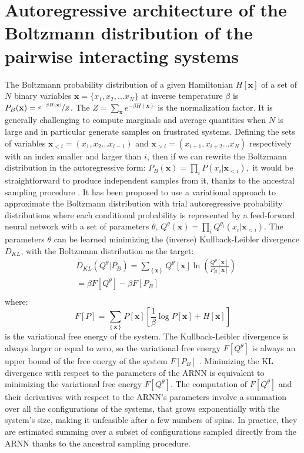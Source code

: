 \documentclass[aps,physrev,10pt,floatfix,reprint]{revtex4-2}
\begin{document}
\section{Autoregressive architecture of the Boltzmann distribution of the pairwise interacting systems}
\label{sec:ARNN_boltzmann}
The Boltzmann probability distribution of a given Hamiltonian $H[\mathbf{x}]$ of a set of $N$ binary variables $\mathbf{x}=\{x_1, x_2,...x_N\}$ at inverse temperature $\beta$ is $P_{B}(\mathbf{x}) = \nicefrac{e^{-\beta H\left(\mathbf{x}\right)}}{Z}$. The $Z=\sum_{\mathbf{x}}e^{-\beta H\left(\mathbf{x}\right)}$ is the normalization factor.
It is generally challenging to compute marginals and average quantities when $N$ is large and in particular generate samples on frustrated systems. Defining the sets of variables $\mathbf{x}_{<i}=\left(x_{1},x_{2}\dots x_{i-1}\right)$ and $\mathbf{x}_{>i}=\left(x_{i+1},x_{i+2}\dots x_{N}\right)$ respectively with an index smaller and larger than $i$, then if we can rewrite the Boltzmann distribution in the autoregressive form:
$
P_{B}\left(\mathbf{x}\right)=\prod_{i}P\left(x_{i}|\mathbf{x}_{<i}\right),
$
it would be straightforward to produce independent samples from it, thanks to the ancestral sampling procedure \cite{Wu2019}. It has been proposed \cite{Wu2019} to use a variational approach to approximate the Boltzmann distribution with trial autoregressive probability distributions where each conditional probability is represented by a feed-forward neural network with a set of parameters ${\theta}$,
$
Q^{\theta}\left(\mathbf{x}\right)=\prod_{i}Q^{\theta_i}\left(x_{i}|\mathbf{x}_{<i}\right)
$.
The parameters ${\theta}$ can be learned minimizing the (inverse) Kullback-Leibler divergence $D_{KL}$,
with the Boltzmann distribution as the target:
\begin{equation}
\begin{split}
& D_{KL}\left(Q^{\theta}| P_{B}\right) =  \sum_{\left\{ \mathbf{x} \right\} } Q^{\theta} [\mathbf{x}]\ln\left(\frac{Q^{\theta}[\mathbf{x}]}{P_{B}[\mathbf{x}]}\right)  \\
& = \beta F[Q^{\theta}] - \beta F[P_{B}]\\
\end{split}
\label{eq:kl}    
\end{equation}
where:
$$
F[P]= \sum_{\left\{ \mathbf{x} \right\}}P[\mathbf{x}]\left[\frac{1}{\beta}\log P[\mathbf{x}] + H[\mathbf{x}] \right] 
$$
is the variational free energy of the system. The Kullback-Leibler divergence is always larger or equal to zero, so the variational free energy $F[Q^{\theta}]$ is always an upper bound of the free energy of the system $F[P_{B}]$ \cite{Wu2019}. Minimizing the KL divergence with respect to the parameters of the ARNN is equivalent to minimizing the variational free energy $F[Q^{\theta}]$. The computation of $F[Q^{\theta}]$ and their derivatives with respect to the ARNN's parameters involve a summation over all the configurations of the systems, that grows exponentially with the system's size, making it unfeasible after a few numbers of spins. In practice, they are estimated summing over a subset of configurations sampled directly from the ARNN thanks to the ancestral sampling procedure\cite{Wu2019}. 
\end{document}
